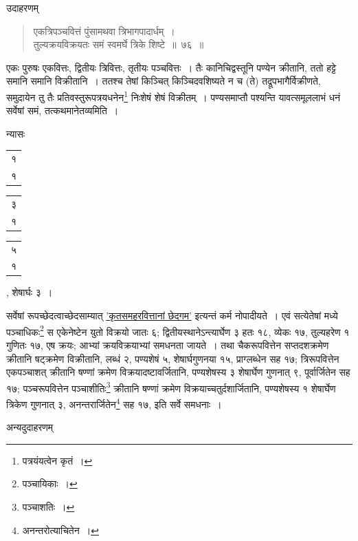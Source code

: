\documentclass[10pt, openany]{book}
\begin{document}
{{\vspace{3mm}
{उदाहरणम्\textemdash}

\begin{quote}
    
{\eg एकत्रिपञ्चवित्तं पुंसामथवा त्रिभागपादार्धम्~। \\
 तुल्यक्रयविक्रयतः समं स्वमर्घे त्रिके शिष्टे~॥~७६~॥}\end{quote} 

{एकः पुरुषः एकवित्तः, द्वितीयः त्रिवित्तः, तृतीयः पञ्चवित्तः~। तैः
कानिचिद्वस्तूनि}
{पण्येन क्रीतानि, ततो हट्टे समानि समानि विक्रीतानि~। ततश्च तेषां
किञ्चित् किञ्चिदवशिष्यते}
{न च (ते) तद्रूपभागैर्विक्रीणते, समुदायेन तु तैः
प्रतिवस्तुरूपत्रयधनेन\renewcommand{\thefootnote}{\s ३}\footnote{\s पत्रयंयत्वेन कृतं~।}  निःशेषं शेषं विक्रीतम्~।}
{पण्यसमाप्तौ पश्यन्ति यावत्समूललाभं धनं सर्वेषां समं, तत्कथमानेतव्यमिति~।}
\vspace{3mm}

{न्यासः\textendash \,\begin{tabular}{r|}१\\ १\end{tabular}\begin{tabular}{r|} ३\\ १\end{tabular}\begin{tabular}{r}५ \\१\end{tabular}, शेषार्घः ३~।}
\vspace{3mm}

{सर्वेषां रूपच्छेदत्वाच्छेदसाम्यात् \hyperref[60]{'कृतसमहरवित्तानां छेदगम'} इत्यन्तं
कर्म नोपादीयते~। एवं सत्येतेषां मध्ये पञ्चाधिकः\renewcommand{\thefootnote}{\s ४}\footnote{\s पञ्चायिकाः~।}   स एकेनेष्टेन युतो
विक्रयो जातः ६;}
{द्वितीयस्थानेऽन्त्यार्घेण ३ हतः १८, व्येकः १७, तुल्यहरेण १ गुणितः १७, एष
क्रयः; आभ्यां}
{क्रयविक्रयाभ्यां समधनता जायते~। तथा चैकरूपवित्तेन सप्तदशक्रमेण क्रीतानि
षट्क्रमेण}
{विक्रीतानि, लब्धं २, पण्यशेषं ५, शेषार्घगुणनया १५, प्राग्लब्धेन सह १७;
त्रिरूपवित्तेन}
{एकपञ्चाशत् क्रीतानि षण्णां क्रमेण विक्रयादष्टावर्जितानि, पण्यशेषस्य ३
शेषार्घेण गुणनात् ९,}
{पूर्वार्जितेन सह १७; पञ्चरूपवित्तेन पञ्चाशीतिः\renewcommand{\thefootnote}{\s ५}\footnote{\s पञ्चाशतिः~।}  क्रीतानि षण्णां
क्रमेण विक्रयाच्चतुर्दशार्जितानि, पण्यशेषस्य १ शेषार्घेण त्रिकेण गुणनात् ३, अनन्तरार्जितेन\renewcommand{\thefootnote}{\s ६}\footnote{\s अनन्तरोत्याचितेन~।} 
सह १७, इति सर्वे समधनाः~।}
\vspace{3mm}

{अन्यदुदाहरणम्\textemdash}
\vspace{2mm}

}}
\end{document}
